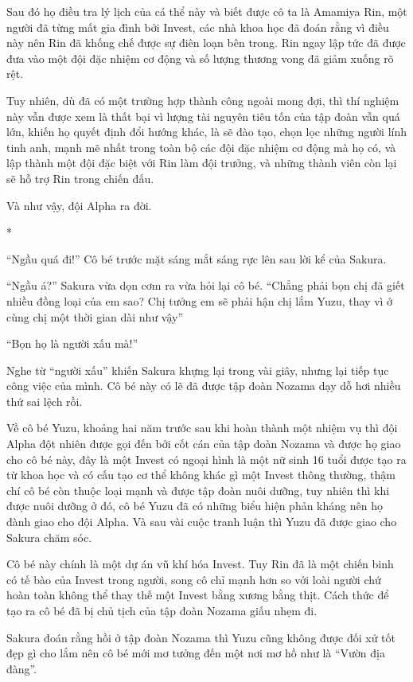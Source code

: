{Sau đó họ điều tra lý lịch của cá thể này và biết được cô ta là Amamiya
Rin, một người đã từng mất gia đình bởi Invest, các nhà khoa học đã đoán
rằng vì điều này nên Rin đã khống chế được sự điên loạn bên trong. Rin
ngay lập tức đã được đưa vào một đội đặc nhiệm cơ động và số lượng
thương vong đã giảm xuống rõ rệt.

Tuy nhiên, dù đã có một trường hợp thành công ngoài mong đợi, thì thí
nghiệm này vẫn được xem là thất bại vì lượng tài nguyên tiêu tốn của tập
đoàn vẫn quá lớn, khiến họ quyết định đổi hướng khác, là sẽ đào tạo,
chọn lọc những người lính tinh anh, mạnh mẽ nhất trong toàn bộ các đội
đặc nhiệm cơ động mà họ có, và lập thành một đội đặc biệt với Rin làm
đội trưởng, và những thành viên còn lại sẽ hỗ trợ Rin trong chiến đấu.

Và như vậy, đội Alpha ra đời.

*

``Ngầu quá đi!'' Cô bé trước mặt sáng mắt sáng rực lên sau lời kể của
Sakura.

``Ngầu á?'' Sakura vừa dọn cơm ra vừa hỏi lại cô bé. ``Chẳng phải bọn
chị đã giết nhiều đồng loại của em sao? Chị tưởng em sẽ phải hận chị lắm
Yuzu, thay vì ở cùng chị một thời gian dài như vậy''

``Bọn họ là người xấu mà!''

Nghe từ ``người xấu'' khiến Sakura khựng lại trong vài giây, nhưng lại
tiếp tục công việc của mình. Cô bé này có lẽ đã được tập đoàn Nozama dạy
dỗ hơi nhiều thứ sai lệch rồi.

Về cô bé Yuzu, khoảng hai năm trước sau khi hoàn thành một nhiệm vụ thì
đội Alpha đột nhiên được gọi đến bởi cốt cán của tập đoàn Nozama và được
họ giao cho cô bé này, đây là một Invest có ngoại hình là một nữ sinh 16
tuổi được tạo ra từ khoa học và có cấu tạo cơ thể không khác gì một
Invest thông thường, thậm chí cô bé còn thuộc loại mạnh và được tập đoàn
nuôi dưỡng, tuy nhiên thì khi được nuôi dưỡng ở đó, cô bé Yuzu đã có
những biểu hiện phản kháng nên họ đành giao cho đội Alpha. Và sau vài
cuộc tranh luận thì Yuzu đã được giao cho Sakura chăm sóc.

Cô bé này chính là một dự án vũ khí hóa Invest. Tuy Rin đã là một chiến
binh có tế bào của Invest trong người, song cô chỉ mạnh hơn so với loài
người chứ hoàn toàn không thể thay thế một Invest bằng xương bằng thịt.
Cách thức để tạo ra cô bé đã bị chủ tịch của tập đoàn Nozama giấu nhẹm
đi.

Sakura đoán rằng hồi ở tập đoàn Nozama thì Yuzu cũng không được đối xử
tốt đẹp gì cho lắm nên cô bé mới mơ tưởng đến một nơi mơ hồ như là
``Vườn địa đàng''.

}
